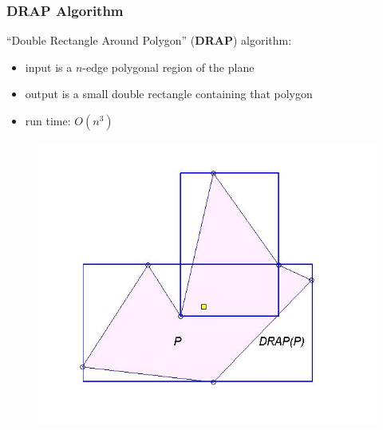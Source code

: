 \documentclass[compress]{beamer}
\begin{document}
\begin{frame} \frametitle{DRAP Algorithm}
``Double Rectangle Around Polygon'' (\textbf{DRAP}) algorithm:\\
\begin{itemize}
     \item input is a $n$-edge polygonal region of the plane
    \item output is a small double rectangle containing that polygon
    \item run time: $O(n^3)$
\end{itemize}

    \begin{figure}
    \includegraphics[scale=0.3]{drap.jpg}
    \end{figure}
\transboxout
\end{frame}
\end{document}
